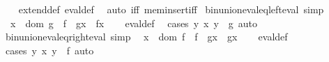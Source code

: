 \begin{isabellebody}
\ \ %
\endisadelimproof
%
\isatagproof
{}\isamarkupfalse%
\ extend{\isacharunderscore}{\kern0pt}def\ eval{\isacharunderscore}{\kern0pt}def\ \isamarkupfalse%
\ {\isacharparenleft}{\kern0pt}auto\ iff{\isacharcolon}{\kern0pt}\ mem{\isacharunderscore}{\kern0pt}insert{\isacharunderscore}{\kern0pt}iff{\isacharparenright}{\kern0pt}%
\endisatagproof
{\isafoldproof}%
%
\isadelimproof
\isanewline
%
\endisadelimproof
\isanewline
{}\isamarkupfalse%
\ bin{\isacharunderscore}{\kern0pt}union{\isacharunderscore}{\kern0pt}eval{\isacharunderscore}{\kern0pt}eq{\isacharunderscore}{\kern0pt}left{\isacharunderscore}{\kern0pt}eval\ {\isacharbrackleft}{\kern0pt}simp{\isacharbrackright}{\kern0pt}{\isacharcolon}{\kern0pt}\isanewline
\ \ {\isachardoublequoteopen}x\ {\isasymnotin}\ dom\ g\ {\isasymLongrightarrow}\ {\isacharparenleft}{\kern0pt}f\ {\isasymunion}\ g{\isacharparenright}{\kern0pt}{\isacharbackquote}{\kern0pt}x\ {\isacharequal}{\kern0pt}\ f{\isacharbackquote}{\kern0pt}x{\isachardoublequoteclose}\isanewline
%
\isadelimproof
\ \ %
\endisadelimproof
%
\isatagproof
{}\isamarkupfalse%
\ eval{\isacharunderscore}{\kern0pt}def\ \isamarkupfalse%
\ {\isacharparenleft}{\kern0pt}cases\ {\isachardoublequoteopen}{\isasymexists}y{\isachardot}{\kern0pt}\ {\isasymlangle}x{\isacharcomma}{\kern0pt}\ y{\isasymrangle}\ {\isasymin}\ g{\isachardoublequoteclose}{\isacharparenright}{\kern0pt}\ auto%
\endisatagproof
{\isafoldproof}%
%
\isadelimproof
\isanewline
%
\endisadelimproof
\isanewline
{}\isamarkupfalse%
\ bin{\isacharunderscore}{\kern0pt}union{\isacharunderscore}{\kern0pt}eval{\isacharunderscore}{\kern0pt}eq{\isacharunderscore}{\kern0pt}right{\isacharunderscore}{\kern0pt}eval\ {\isacharbrackleft}{\kern0pt}simp{\isacharbrackright}{\kern0pt}{\isacharcolon}{\kern0pt}\isanewline
\ \ {\isachardoublequoteopen}x\ {\isasymnotin}\ dom\ f\ {\isasymLongrightarrow}\ {\isacharparenleft}{\kern0pt}f\ {\isasymunion}\ g{\isacharparenright}{\kern0pt}{\isacharbackquote}{\kern0pt}x\ {\isacharequal}{\kern0pt}\ g{\isacharbackquote}{\kern0pt}x{\isachardoublequoteclose}\isanewline
%
\isadelimproof
\ \ %
\endisadelimproof
%
\isatagproof
{}\isamarkupfalse%
\ eval{\isacharunderscore}{\kern0pt}def\ \isamarkupfalse%
\ {\isacharparenleft}{\kern0pt}cases\ {\isachardoublequoteopen}{\isasymexists}y{\isachardot}{\kern0pt}\ {\isasymlangle}x{\isacharcomma}{\kern0pt}\ y{\isasymrangle}\ {\isasymin}\ f{\isachardoublequoteclose}{\isacharparenright}{\kern0pt}\ auto%
\endisatagproof
{\isafoldproof}%

\end{isabellebody}
